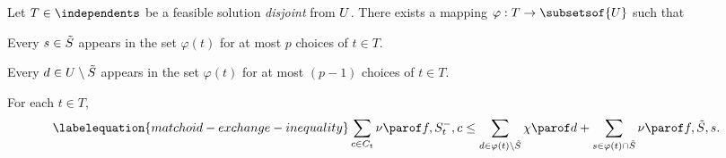 \documentclass[oneside,letterpaper]{scrartcl} \usepackage{macros}
\begin{document}
\begin{lemma}
  Let $T \in \independents$ be a feasible solution \emph{disjoint}
  from $U$. There exists a mapping $\varphi: T \to
  \subsetsof{\takens}$ such that
  \begin{results}
  \item Every $s \in \tilde{S}$ appears in the set $\varphi(t)$ for at
    most $p$ choices of $t \in T$.
  \item Every $d \in U \setminus \tilde{S}$ appears in the set $\varphi(t)$
    for at most $(p-1)$ choices of $t \in T$.
  \item For each $t \in T$,
    \begin{align}\labelequation{matchoid-exchange-inequality}\sum_{c \in \candidatesfor{t}}
      \incvalueof{f}{\setbefore{t}}{c} &\leq \sum_{\deleted \in \varphi(t) \setminus \finalset}
      \exitvalueof{\deleted}+\sum_{s \in \varphi(t) \cap
        \finalset}\incvalueof{f}{\finalset}{s}.
    \end{align}
  \end{results}
\end{lemma}
\end{document}
